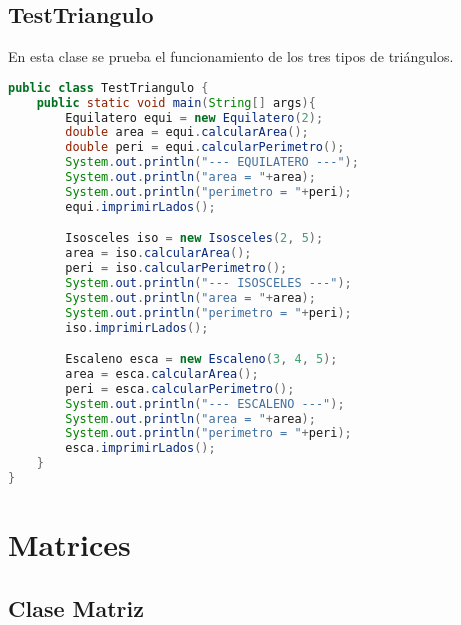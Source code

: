 \documentclass{article}
\begin{document}
\subsection{TestTriangulo}

En esta clase se prueba el funcionamiento de los tres tipos de triángulos.

\begin{lstlisting}[language=Java]
public class TestTriangulo {
    public static void main(String[] args){
        Equilatero equi = new Equilatero(2);
        double area = equi.calcularArea();
        double peri = equi.calcularPerimetro();
        System.out.println("--- EQUILATERO ---");
        System.out.println("area = "+area);
        System.out.println("perimetro = "+peri);
        equi.imprimirLados();

        Isosceles iso = new Isosceles(2, 5);
        area = iso.calcularArea();
        peri = iso.calcularPerimetro();
        System.out.println("--- ISOSCELES ---");
        System.out.println("area = "+area);
        System.out.println("perimetro = "+peri);
        iso.imprimirLados();

        Escaleno esca = new Escaleno(3, 4, 5);
        area = esca.calcularArea();
        peri = esca.calcularPerimetro();
        System.out.println("--- ESCALENO ---");
        System.out.println("area = "+area);
        System.out.println("perimetro = "+peri);
        esca.imprimirLados();
    }
}
\end{lstlisting}

\section{Matrices}

\subsection{Clase Matriz}
\end{document}
